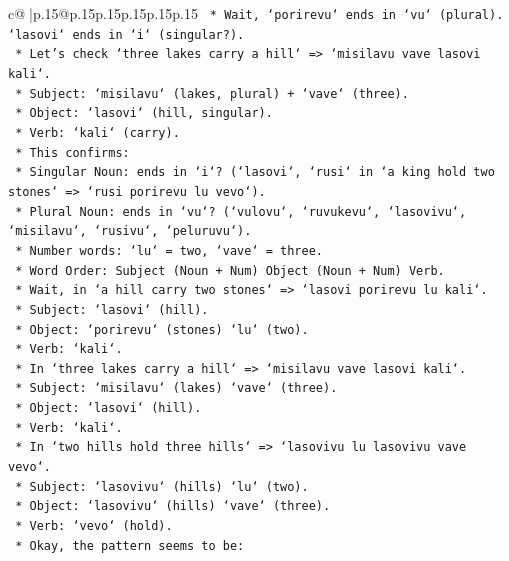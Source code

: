 \documentclass{article}
\begin{document}
{\begin{supertabular}{c@{$\;$}|p{.15\linewidth}@{}p{.15\linewidth}p{.15\linewidth}p{.15\linewidth}p{.15\linewidth}p{.15\linewidth}}
{{{\texttt{        *   Wait, `porirevu` ends in `vu` (plural). `lasovi` ends in `i` (singular?).} \\
\texttt{        *   Let's check `three lakes carry a hill` => `misilavu vave lasovi kali`.} \\
\texttt{            *   Subject: `misilavu` (lakes, plural) + `vave` (three).} \\
\texttt{            *   Object: `lasovi` (hill, singular).} \\
\texttt{            *   Verb: `kali` (carry).} \\
\texttt{        *   This confirms:} \\
\texttt{            *   Singular Noun: ends in `i`? (`lasovi`, `rusi` in `a king hold two stones` => `rusi porirevu lu vevo`).} \\
\texttt{            *   Plural Noun: ends in `vu`? (`vulovu`, `ruvukevu`, `lasovivu`, `misilavu`, `rusivu`, `peluruvu`).} \\
\texttt{            *   Number words: `lu` = two, `vave` = three.} \\
\texttt{            *   Word Order: Subject (Noun + Num) Object (Noun + Num) Verb.} \\
\texttt{            *   Wait, in `a hill carry two stones` => `lasovi porirevu lu kali`.} \\
\texttt{                *   Subject: `lasovi` (hill).} \\
\texttt{                *   Object: `porirevu` (stones) `lu` (two).} \\
\texttt{                *   Verb: `kali`.} \\
\texttt{            *   In `three lakes carry a hill` => `misilavu vave lasovi kali`.} \\
\texttt{                *   Subject: `misilavu` (lakes) `vave` (three).} \\
\texttt{                *   Object: `lasovi` (hill).} \\
\texttt{                *   Verb: `kali`.} \\
\texttt{            *   In `two hills hold three hills` => `lasovivu lu lasovivu vave vevo`.} \\
\texttt{                *   Subject: `lasovivu` (hills) `lu` (two).} \\
\texttt{                *   Object: `lasovivu` (hills) `vave` (three).} \\
\texttt{                *   Verb: `vevo` (hold).} \\
\texttt{    *   Okay, the pattern seems to be:} \\
}}}
\end{supertabular}}
\end{document}
